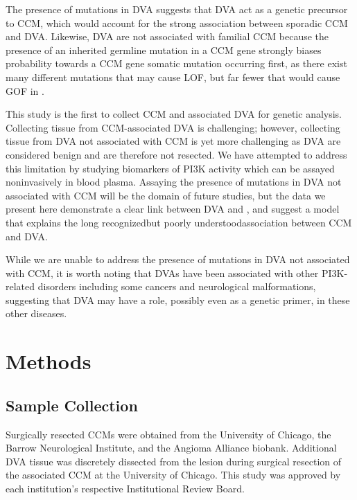 The presence of  mutations in DVA suggests that DVA act as a genetic precursor to CCM, which would account for the strong association between sporadic CCM and DVA. Likewise, DVA are not associated with familial CCM because the presence of an inherited germline mutation in a CCM gene strongly biases probability towards a CCM gene somatic mutation occurring first, as there exist many different mutations that may cause LOF, but far fewer that would cause GOF in . 

This study is the first to collect CCM and associated DVA for genetic analysis. Collecting tissue from CCM-associated DVA is challenging; however, collecting tissue from DVA not associated with CCM is yet more challenging as DVA are considered benign and are therefore not resected. We have attempted to address this limitation by studying biomarkers of PI3K activity which can be assayed noninvasively in blood plasma. Assaying the presence of  mutations in DVA not associated with CCM will be the domain of future studies, but the data we present here demonstrate a clear link between DVA and , and suggest a model that explains the long recognized\textemdash but poorly understood\textemdash association between CCM and DVA. 

While we are unable to address the presence of  mutations in DVA not associated with CCM, it is worth noting that DVAs have been associated with other PI3K-related disorders\citep{brinjikji2018, dhamija2018, rasalkar2010, roux2020, santucci2008, tan2007, ucler2019} including some cancers and neurological malformations, suggesting that DVA may have a role, possibly even as a genetic primer, in these other diseases. 



\section{Methods}
\subsection{Sample Collection}
	Surgically resected CCMs were obtained from the University of Chicago, the Barrow Neurological Institute, and the Angioma Alliance biobank. Additional DVA tissue was discretely dissected from the lesion during surgical resection of the associated CCM at the University of Chicago. This study was approved by each institution’s respective Institutional Review Board. 

